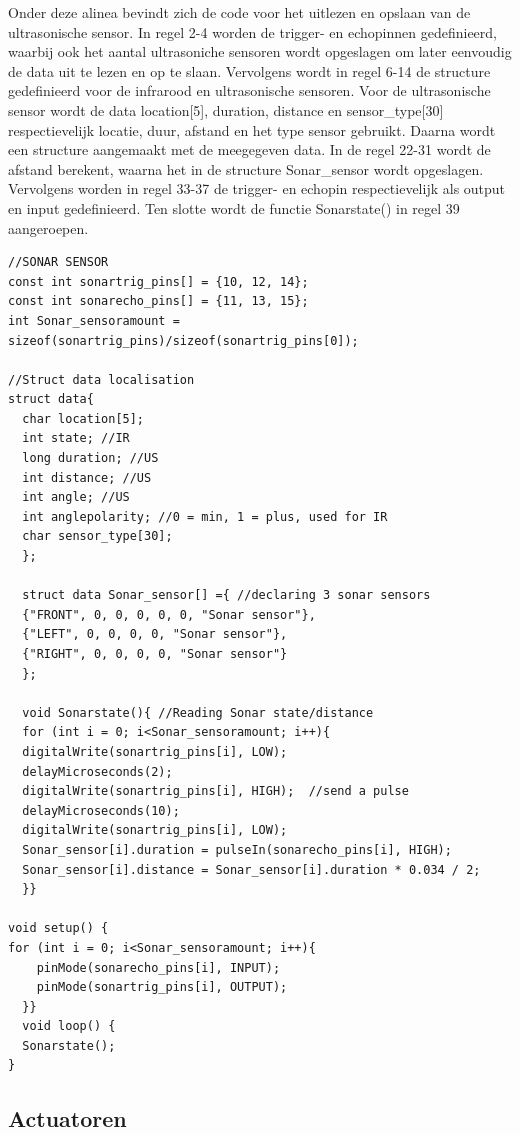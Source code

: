 Onder deze alinea bevindt zich de code voor het uitlezen en opslaan van de ultrasonische sensor. In regel 2-4 worden de trigger- en echopinnen gedefinieerd, waarbij ook het aantal ultrasoniche sensoren wordt opgeslagen om later eenvoudig de data uit te lezen en op te slaan. Vervolgens wordt in regel 6-14 de structure gedefinieerd voor de infrarood en ultrasonische sensoren. Voor de ultrasonische sensor wordt de data location[5], duration, distance en sensor\_type[30] respectievelijk locatie, duur, afstand en het type sensor gebruikt. Daarna wordt een structure aangemaakt met de meegegeven data. In de regel 22-31 wordt de afstand berekent, waarna het in de structure Sonar\_sensor wordt opgeslagen. Vervolgens worden in regel 33-37 de trigger- en echopin respectievelijk als output en input gedefinieerd. Ten slotte wordt de functie Sonarstate() in regel 39  aangeroepen.
\begin{lstlisting}
//SONAR SENSOR
const int sonartrig_pins[] = {10, 12, 14};
const int sonarecho_pins[] = {11, 13, 15};
int Sonar_sensoramount = sizeof(sonartrig_pins)/sizeof(sonartrig_pins[0]);

//Struct data localisation
struct data{
  char location[5];
  int state; //IR
  long duration; //US
  int distance; //US
  int angle; //US
  int anglepolarity; //0 = min, 1 = plus, used for IR
  char sensor_type[30];
  };
  
  struct data Sonar_sensor[] ={ //declaring 3 sonar sensors 
  {"FRONT", 0, 0, 0, 0, 0, "Sonar sensor"},
  {"LEFT", 0, 0, 0, 0, "Sonar sensor"},
  {"RIGHT", 0, 0, 0, 0, "Sonar sensor"}
  };
  
  void Sonarstate(){ //Reading Sonar state/distance
  for (int i = 0; i<Sonar_sensoramount; i++){
  digitalWrite(sonartrig_pins[i], LOW); 
  delayMicroseconds(2);
  digitalWrite(sonartrig_pins[i], HIGH);  //send a pulse
  delayMicroseconds(10);
  digitalWrite(sonartrig_pins[i], LOW); 
  Sonar_sensor[i].duration = pulseIn(sonarecho_pins[i], HIGH);
  Sonar_sensor[i].distance = Sonar_sensor[i].duration * 0.034 / 2; 
  }}
  
void setup() {
for (int i = 0; i<Sonar_sensoramount; i++){
    pinMode(sonarecho_pins[i], INPUT);
    pinMode(sonartrig_pins[i], OUTPUT);
  }}
  void loop() {
  Sonarstate();  
}

\end{lstlisting}

\subsection{Actuatoren}
